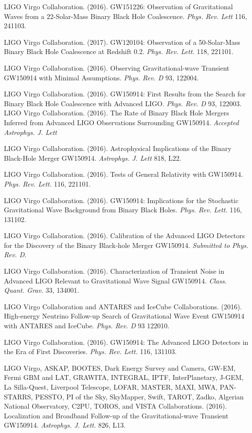 LIGO Virgo Collaboration. (2016). GW151226: Observation of Gravitational Waves from a 22-Solar-Mass Binary Black Hole Coalescence. {\em Phys. Rev. Lett} 116, 241103.
  
  LIGO Virgo Collaboration. (2017). GW120104: Observation of a 50-Solar-Mass Binary Black Hole Coalescence at Redshift 0.2. {\em Phys. Rev. Lett.} 118, 221101.

  LIGO Virgo Collaboration. (2016). Observing Gravitational-wave Transient GW150914 with Minimal Assumptions. {\em Phys. Rev. D} 93, 122004.

  LIGO Virgo Collaboration. (2016). GW150914: First Results from the Search for Binary Black Hole Coalescence with Advanced LIGO. {\em Phys. Rev. D} 93, 122003.
  LIGO Virgo Collaboration. (2016). The Rate of Binary Black Hole Mergers Inferred from Advanced LIGO Observations Surrounding GW150914. {\em Accepted Astrophys. J. Lett}

  LIGO Virgo Collaboration. (2016). Astrophysical Implications of the Binary Black-Hole Merger GW150914. {\em Astrophys. J. Lett} 818, L22.

  LIGO Virgo Collaboration. (2016). Tests of General Relativity with GW150914. {\em Phys. Rev. Lett.} 116, 221101.
  
  LIGO Virgo Collaboration. (2016). GW150914: Implications for the Stochastic Gravitational Wave Background from Binary Black Holes. {\em Phys. Rev. Lett.} 116, 131102.

  LIGO Virgo Collaboration. (2016). Calibration of the Advanced LIGO Detectors for the Discovery of the Binary Black-hole Merger GW150914. {\em Submitted to Phys. Rev. D}.

  LIGO Virgo Collaboration. (2016). Characterization of Transient Noise in Advanced LIGO Relevant to Gravitational Wave Signal GW150914. {\em Class. Quant. Grav.} 33, 134001.

  LIGO Virgo Collaboration and ANTARES and IceCube Collaborations. (2016). High-energy Neutrino Follow-up Search of Gravitational Wave Event GW150914 with ANTARES and IceCube. {\em Phys. Rev. D} 93 122010. 

  LIGO Virgo Collaboration. (2016). GW150914: The Advanced LIGO Detectors in the Era of First Discoveries. {\em Phys. Rev. Lett.} 116, 131103.

  LIGO Virgo, ASKAP, BOOTES, Dark Energy Survey and Camera, GW-EM, Fermi GBM and LAT, GRAWITA, INTEGRAL, IPTF, InterPlanetary, J-GEM, La Silla-Quest, Liverpool Telescope, LOFAR, MASTER, MAXI, MWA, PAN-STARRS, PESSTO, PI of the Sky, SkyMapper, Swift, TAROT, Zadko, Algerian National Observatory, C2PU, TOROS, and VISTA Collaborations. (2016). Localization and Broadband Follow-up of the Gravitational-wave Transient GW150914. {\em Astrophys. J. Lett.} 826, L13.
  
